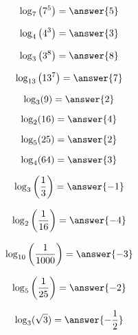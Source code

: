 \documentclass{ximera}
\author{Lee Wayand}
\begin{document}
\begin{example}













\[
\log_7\left( 7^5 \right) = \answer{5}
\]





\[
\log_4\left( 4^3 \right) = \answer{3}
\]







\[
\log_3\left( 3^8 \right) = \answer{8}
\]





\[
\log_{13}\left( 13^7 \right) = \answer{7}
\]









\[
\log_3(9) = \answer{2}
\]





\[
\log_2(16) = \answer{4}
\]






\[
\log_5(25) = \answer{2}
\]





\[
\log_4(64) = \answer{3}
\]
















\[
\log_3\left( \frac{1}{3} \right) = \answer{-1}
\]






\[
\log_2\left( \frac{1}{16} \right) = \answer{-4}
\]






\[
\log_{10}\left( \frac{1}{1000} \right) = \answer{-3}
\]





\[
\log_5\left( \frac{1}{25} \right) = \answer{-2}
\]









\[
\log_3(\sqrt{3}) = \answer{-\frac{1}{2}}
\]












\end{example}
\end{document}
